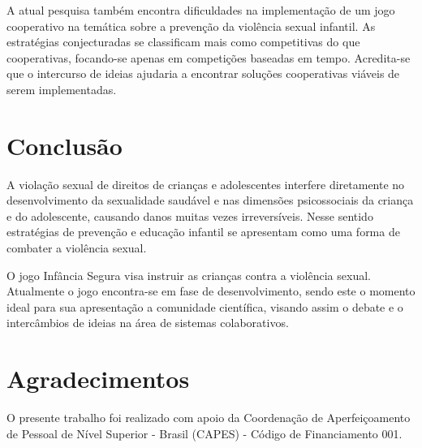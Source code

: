 \documentclass[12pt]{article}
\begin{document}
A atual pesquisa também encontra dificuldades na implementação de um jogo cooperativo na temática sobre a prevenção da violência sexual infantil. As estratégias conjecturadas se classificam mais como competitivas do que cooperativas, focando-se apenas em competições baseadas em tempo. Acredita-se que o intercurso de ideias ajudaria a encontrar soluções cooperativas viáveis de serem implementadas. 


\section{Conclusão}\label{secao:conclusao}

A violação sexual de direitos de crianças e adolescentes interfere diretamente no desenvolvimento da sexualidade saudável e nas dimensões psicossociais da criança e do adolescente, causando danos muitas vezes irreversíveis. Nesse sentido estratégias de prevenção e educação infantil se apresentam como uma forma de combater a violência sexual.

O jogo Infância Segura visa instruir as crianças contra a violência sexual. Atualmente o jogo encontra-se em fase de desenvolvimento, sendo este o momento ideal para sua apresentação a comunidade científica, visando assim o debate e o intercâmbios de ideias na área de sistemas colaborativos.

\section*{Agradecimentos}\label{secao:agradecimentos}

O presente trabalho foi realizado com apoio da Coordenação de Aperfeiçoamento de Pessoal de Nível Superior - Brasil (CAPES) - Código de Financiamento 001.

\vspace{-0.3cm}

%

\end{document}
